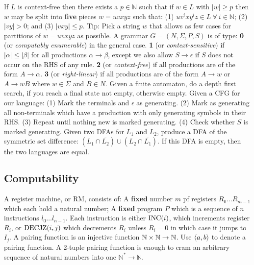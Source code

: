  If $L$ is context-free then there exists a $p \in \mathbb{N}$ such that if $w \in L$ with $|w| \ge p$  then $w$ may be split into \textbf{five} pieces $w = uvxyz$ such that: (1) $uv^ixy^iz \in L \ \forall\ i \in \mathbb{N}$; (2) $|vy| > 0$; and (3) $|vxy| \le p$. Tip: Pick a string $w$ that allows as few cases for partitions of $w = uvxyz$ as possible.
 A grammar $G = (N, \Sigma, P, S)$ is of type: \textbf{0} (or \emph{computably enumerable}) in the general case. \textbf{1} (or \emph{context-sensitive}) if $| \alpha| \le |\beta|$ for all productions $\alpha \to \beta$, except we also allow $S \to \epsilon$ if $S$ does not occur on the RHS of any rule. \textbf{2} (or \emph{context-free}) if all productions are of the form $A \to \alpha$. \textbf{3} (or \emph{right-linear}) if all productions are of the form $A \to w$ or $A \to wB$ where $w \in \Sigma$ and $B \in N$.
 Given a finite automaton, do a depth first search, if you reach a final state not empty, otherwise empty.
 Given a CFG for our language: (1) Mark the terminals and $\epsilon$ as generating. (2) Mark as generating all non-terminals which have a production with only generating symbols in their RHS. (3) Repeat until nothing new is marked generating. (4) Check whether $S$ is marked generating.
 Given two DFAs for $L_1$ and $L_2$, produce a DFA of the symmetric set difference: $(L_1 \cap \overline{L_2}) \cup (L_2 \cap \overline{L_1})$. If this DFA is empty, then the two languages are equal.
\subsection*{Computability}
 A register machine, or RM, consists of: A \textbf{fixed} number $m$ pf registers $R_0 \ldots R_{m-1}$ which each hold a natural number; A \textbf{fixed} program $P$ which is a sequence of $n$ instructions $l_0 \ldots l_{n-1}$. Each instruction is either $\operatorname{INC}(i)$, which increments register $R_i$, or $\operatorname{DECJZ}(i,j)$ which decrements $R_i$ unless $R_i = 0$ in which case it jumps to $I_j$.
 A pairing function is an injective function $\mathbb{N} \times \mathbb{N} \to \mathbb{N}$. Use $\langle a,b \rangle$ to denote a pairing function.
 A 2-tuple pairing function is enough to cram an arbitrary sequence of natural numbers into one $\mathbb{N}^* \to \mathbb{N}$.